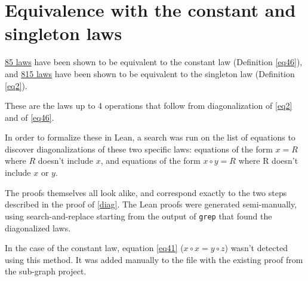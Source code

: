 \chapter{Equivalence with the constant and singleton laws}

\href{https://github.com/teorth/equational_theories/blob/main/equational_theories/Generated/Constant.lean}{85 laws} have been shown to be equivalent to the constant law (Definition \ref{eq46}), and \href{https://github.com/teorth/equational_theories/blob/main/equational_theories/Generated/Singleton.lean}{815 laws} have been shown to be equivalent to the singleton law (Definition \ref{eq2}).

These are the laws up to 4 operations that follow from diagonalization of \ref{eq2} and of \ref{eq46}.

In order to formalize these in Lean, a search was run on the list of equations to discover
diagonalizations of these two specific laws: equations of the form $x = R$ where $R$ doesn't include
$x$, and equations of the form $x \circ y = R$ where R doesn't include $x$ or $y$.

The proofs themselves all look alike, and correspond exactly to the two steps described in the proof
of \ref{diag}. The Lean proofs were generated semi-manually, using search-and-replace starting from
the output of \texttt{grep} that found the diagonalized laws.

In the case of the constant law, equation \ref{eq41} ($x \circ x = y \circ z$) wasn't detected using
this method. It was added manually to the file with the existing proof from the sub-graph project.

